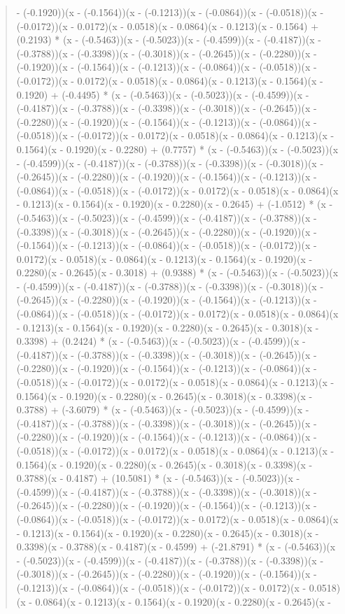 \documentclass[a4paper, 12pt]{article}
\begin{document}
\begin{quote}
- (-0.1920))(x - (-0.1564))(x - (-0.1213))(x - (-0.0864))(x - (-0.0518))(x - (-0.0172))(x - 0.0172)(x - 0.0518)(x - 0.0864)(x - 0.1213)(x - 0.1564) + (0.2193) * (x - (-0.5463))(x - (-0.5023))(x - (-0.4599))(x - (-0.4187))(x - (-0.3788))(x - (-0.3398))(x - (-0.3018))(x - (-0.2645))(x - (-0.2280))(x - (-0.1920))(x - (-0.1564))(x - (-0.1213))(x - (-0.0864))(x - (-0.0518))(x - (-0.0172))(x - 0.0172)(x - 0.0518)(x - 0.0864)(x - 0.1213)(x - 0.1564)(x - 0.1920) + (-0.4495) * (x - (-0.5463))(x - (-0.5023))(x - (-0.4599))(x - (-0.4187))(x - (-0.3788))(x - (-0.3398))(x - (-0.3018))(x - (-0.2645))(x - (-0.2280))(x - (-0.1920))(x - (-0.1564))(x - (-0.1213))(x - (-0.0864))(x - (-0.0518))(x - (-0.0172))(x - 0.0172)(x - 0.0518)(x - 0.0864)(x - 0.1213)(x - 0.1564)(x - 0.1920)(x - 0.2280) + (0.7757) * (x - (-0.5463))(x - (-0.5023))(x - (-0.4599))(x - (-0.4187))(x - (-0.3788))(x - (-0.3398))(x - (-0.3018))(x - (-0.2645))(x - (-0.2280))(x - (-0.1920))(x - (-0.1564))(x - (-0.1213))(x - (-0.0864))(x - (-0.0518))(x - (-0.0172))(x - 0.0172)(x - 0.0518)(x - 0.0864)(x - 0.1213)(x - 0.1564)(x - 0.1920)(x - 0.2280)(x - 0.2645) + (-1.0512) * (x - (-0.5463))(x - (-0.5023))(x - (-0.4599))(x - (-0.4187))(x - (-0.3788))(x - (-0.3398))(x - (-0.3018))(x - (-0.2645))(x - (-0.2280))(x - (-0.1920))(x - (-0.1564))(x - (-0.1213))(x - (-0.0864))(x - (-0.0518))(x - (-0.0172))(x - 0.0172)(x - 0.0518)(x - 0.0864)(x - 0.1213)(x - 0.1564)(x - 0.1920)(x - 0.2280)(x - 0.2645)(x - 0.3018) + (0.9388) * (x - (-0.5463))(x - (-0.5023))(x - (-0.4599))(x - (-0.4187))(x - (-0.3788))(x - (-0.3398))(x - (-0.3018))(x - (-0.2645))(x - (-0.2280))(x - (-0.1920))(x - (-0.1564))(x - (-0.1213))(x - (-0.0864))(x - (-0.0518))(x - (-0.0172))(x - 0.0172)(x - 0.0518)(x - 0.0864)(x - 0.1213)(x - 0.1564)(x - 0.1920)(x - 0.2280)(x - 0.2645)(x - 0.3018)(x - 0.3398) + (0.2424) * (x - (-0.5463))(x - (-0.5023))(x - (-0.4599))(x - (-0.4187))(x - (-0.3788))(x - (-0.3398))(x - (-0.3018))(x - (-0.2645))(x - (-0.2280))(x - (-0.1920))(x - (-0.1564))(x - (-0.1213))(x - (-0.0864))(x - (-0.0518))(x - (-0.0172))(x - 0.0172)(x - 0.0518)(x - 0.0864)(x - 0.1213)(x - 0.1564)(x - 0.1920)(x - 0.2280)(x - 0.2645)(x - 0.3018)(x - 0.3398)(x - 0.3788) + (-3.6079) * (x - (-0.5463))(x - (-0.5023))(x - (-0.4599))(x - (-0.4187))(x - (-0.3788))(x - (-0.3398))(x - (-0.3018))(x - (-0.2645))(x - (-0.2280))(x - (-0.1920))(x - (-0.1564))(x - (-0.1213))(x - (-0.0864))(x - (-0.0518))(x - (-0.0172))(x - 0.0172)(x - 0.0518)(x - 0.0864)(x - 0.1213)(x - 0.1564)(x - 0.1920)(x - 0.2280)(x - 0.2645)(x - 0.3018)(x - 0.3398)(x - 0.3788)(x - 0.4187) + (10.5081) * (x - (-0.5463))(x - (-0.5023))(x - (-0.4599))(x - (-0.4187))(x - (-0.3788))(x - (-0.3398))(x - (-0.3018))(x - (-0.2645))(x - (-0.2280))(x - (-0.1920))(x - (-0.1564))(x - (-0.1213))(x - (-0.0864))(x - (-0.0518))(x - (-0.0172))(x - 0.0172)(x - 0.0518)(x - 0.0864)(x - 0.1213)(x - 0.1564)(x - 0.1920)(x - 0.2280)(x - 0.2645)(x - 0.3018)(x - 0.3398)(x - 0.3788)(x - 0.4187)(x - 0.4599) + (-21.8791) * (x - (-0.5463))(x - (-0.5023))(x - (-0.4599))(x - (-0.4187))(x - (-0.3788))(x - (-0.3398))(x - (-0.3018))(x - (-0.2645))(x - (-0.2280))(x - (-0.1920))(x - (-0.1564))(x - (-0.1213))(x - (-0.0864))(x - (-0.0518))(x - (-0.0172))(x - 0.0172)(x - 0.0518)(x - 0.0864)(x - 0.1213)(x - 0.1564)(x - 0.1920)(x - 0.2280)(x - 0.2645)(x - 
\end{quote}
\end{document}
